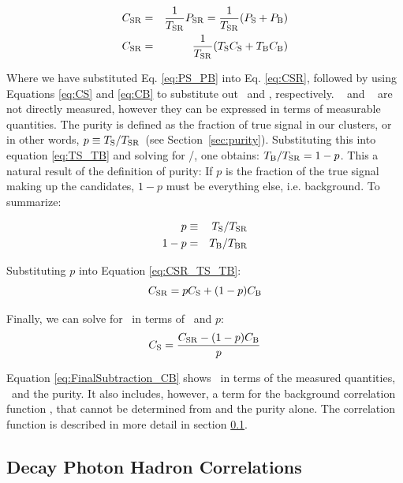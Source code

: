 \begin{eqnarray}
  \label{eq:31}
  C_{\mathrm{SR}} &=& \frac{1}{T_{\mathrm{SR}}}P_{\mathrm{SR}} = \frac{1}{T_{\mathrm{SR}}}(P_{\mathrm{S}} + P_{\mathrm{B}})\\
  C_{\mathrm{SR}} &=& \frac{1}{T_{\mathrm{SR}}}(T_{\mathrm{S}}C_{\mathrm{S}} +T_{\mathrm{B}}C_{\mathrm{B}})\label{eq:CSR_TS_TB}
\end{eqnarray}

Where we have substituted Eq. \ref{eq:PS_PB} into  Eq. \ref{eq:CSR}, followed by using Equations \ref{eq:CS} and \ref{eq:CB} to substitute out \PS~and \PB, respectively. \TS~ and \TB~ are not directly measured, however they can be expressed in terms of measurable quantities. The purity is defined as the fraction of true signal in our \gammaiso clusters, or in other words, $p \equiv T_{\mathrm{S}}/T_{\mathrm{SR}}$~(see Section~\ref{sec:purity}). Substituting this into equation \ref{eq:TS_TB} and solving for \TB/\TSR, one obtains: $T_{\mathrm{B}}/T_{\mathrm{SR}} = 1-p$. This a natural result of the definition of purity: If $p$ is the fraction of the true signal making up the \gammaiso candidates, $1-p$ must be everything else, i.e. background. To summarize:

\begin{eqnarray}
  p &\equiv & T_{\mathrm{S}}/T_{\mathrm{SR}}\\
  1-p &=& T_{\mathrm{B}}/T_{\mathrm{BR}}
\end{eqnarray}


Substituting $p$ into Equation \ref{eq:CSR_TS_TB}:
\begin{equation}
  C_{\mathrm{SR}} = pC_{\mathrm{S}}+ (1-p)C_{\mathrm{B}} \label{eq:CSR_CS}
\end{equation}

Finally, we can solve for \CS~in terms of \CSR~and $p$:
\begin{equation}
  C_{\mathrm{S}} = \frac{C_{\mathrm{SR}} - (1-p) C_{\mathrm{B}}}{p}
  \label{eq:FinalSubtraction_CB}
\end{equation}


Equation \ref{eq:FinalSubtraction_CB} shows \CS~in terms of the measured quantities, \CSR~and the purity. It also includes, however, a term for the background correlation function \CB, that cannot be determined from \CSR and the purity alone. The correlation function \CB is described in more detail in section \ref{sec:cb}.

\subsection{Decay Photon Hadron Correlations}
\label{sec:cb}

